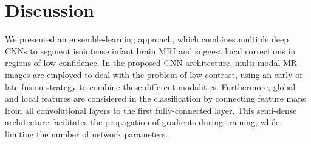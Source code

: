 \documentclass[twoside,espcrc2]{elsarticle}
\begin{document}
\begin{comment}
\begin{figure}[ht!]
\begin{center}
     \mbox{
        \texttt{[image: Subject11-T1.png]}
        \hspace{-2.5 mm}
        \texttt{[image: Subject11-T2.png]}
        \hspace{-2.5 mm}
        \texttt{[image: Subject11-CSF.png]}
        \hspace{-2.5 mm}
        \texttt{[image: Subject11-GM.png]}
        \hspace{-2.5 mm}
        \texttt{[image: Subject11-WM.png]}
        \hspace{-2.5 mm}
        \texttt{[image: Subject11-Labels.png]}
        
        }
        
        \mbox{
        \texttt{[image: Subj17\_T1.png]}
        \hspace{-2.5 mm}
        \texttt{[image: Subj17\_T2.png]}
        \hspace{-2.5 mm}
        \texttt{[image: Subj17\_CSF.png]}
        \hspace{-2.5 mm}
        \texttt{[image: Subj17\_GM.png]}
        \hspace{-2.5 mm}
        \texttt{[image: Subj17\_WM.png]}
        \hspace{-2.5 mm}
        \texttt{[image: Subj17\_Labels.png]}
        
        }
\caption{\textcolor{red}{Elaborate this.}Agreement of the CNNs composing the ensemble (first row patient 11.).}
\label{fig:Agreement}
\end{center}
\end{figure}
\end{comment}




\section{Discussion}\label{sec:discussion}

We presented an ensemble-learning approach, which combines multiple deep CNNs to segment isointense infant brain MRI and suggest local corrections in regions of low confidence. In the proposed CNN architecture, multi-modal MR images are employed to deal with the problem of low contrast, using an early or late fusion strategy to combine these different modalities. Furthermore, global and local features are considered in the classification by connecting feature maps from all convolutional layers to the first fully-connected layer. This semi-dense architecture facilitates the propagation of gradients during training, while limiting the number of network parameters.
\end{document}
